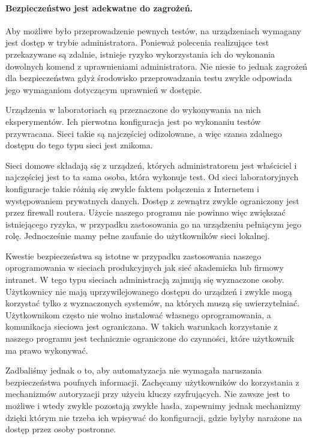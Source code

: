 \documentclass[00-praca-magisterska.tex]{subfiles}
\begin{document}
\paragraph{Bezpieczeństwo jest adekwatne do zagrożeń.} Aby możliwe było
przeprowadzenie pewnych testów, na urządzeniach wymagany jest dostęp w trybie
administratora. Ponieważ polecenia realizujące test przekazywane są zdalnie,
istnieje ryzyko wykorzystania ich do wykonania dowolnych komend z uprawnieniami
administratora. Nie niesie to jednak zagrożeń dla bezpieczeństwa gdyż środowisko
przeprowadzania testu zwykle odpowiada jego wymaganiom dotyczącym uprawnień w
dostępie.

Urządzenia w laboratoriach są przeznaczone do wykonywania na nich
eksperymentów.  Ich pierwotna konfiguracja jest po wykonaniu testów
przywracana. Sieci takie są najczęściej odizolowane, a więc szansa zdalnego
dostępu do tego typu sieci jest znikoma.

Sieci domowe składają się z urządzeń, których administratorem jest właściciel i
najczęściej jest to ta sama osoba, która wykonuje test. Od sieci laboratoryjnych
konfiguracje takie różnią się zwykle faktem połączenia z Internetem i
występowaniem prywatnych danych. Dostęp z zewnątrz zwykle ograniczony jest przez
firewall routera. Użycie naszego programu nie powinno więc zwiększać
istniejącego ryzyka, w przypadku zastosowania go na urządzeniu pełniącym jego
rolę. Jednocześnie mamy pełne zaufanie do użytkowników sieci lokalnej.

Kwestie bezpieczeństwa są istotne w przypadku zastosowania naszego
oprogramowania w sieciach produkcyjnych jak sieć akademicka lub firmowy
intranet. W tego typu sieciach administracją zajmują się wyznaczone osoby.
Użytkownicy nie mają uprzywilejowanego dostępu do urządzeń i zwykle mogą
korzystać tylko z wyznaczonych systemów, na których muszą się uwierzytelniać.
Użytkownikom często nie wolno instalować własnego oprogramowania, a komunikacja
sieciowa jest ograniczana. W takich warunkach korzystanie z naszego programu
jest technicznie ograniczone do czynności, które użytkownik ma prawo wykonywać. 

Zadbaliśmy jednak o to, aby automatyzacja nie wymagała naruszania
bezpieczeństwa poufnych informacji. Zachęcamy użytkowników do korzystania z
mechanizmów autoryzacji przy użyciu kluczy szyfrujących. Nie zawsze jest to
możliwe i wtedy zwykle pozostają zwykłe hasła, zapewnimy jednak mechanizmy
dzięki którym nie trzeba ich wpisywać do konfiguracji, gdzie byłyby narażone na
dostęp przez osoby postronne.
\end{document}
